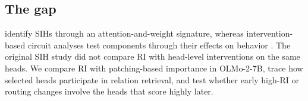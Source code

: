 \subsection{The gap}
\label{sec:rw-gap}
\citet{ren2024semantic} identify SIHs through an attention-and-weight signature, whereas intervention-based circuit analyses test components through their effects on behavior \citep{wang2023ioi,conmy2023acdc}. The original SIH study did not compare RI with head-level interventions on the same heads. We compare RI with patching-based importance in OLMo-2-7B, trace how selected heads participate in relation retrieval, and test whether early high-RI or routing changes involve the heads that score highly later.
